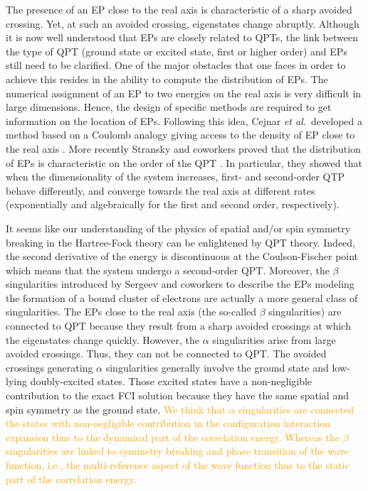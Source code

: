 \documentclass[11pt,a4paper]{article}
\newcommand{\antoine}[1]{\textcolor{orange}{#1}}
\begin{document}
The presence of an EP close to the real axis is characteristic of a sharp avoided crossing. Yet, at such an avoided crossing, eigenstates change abruptly. Although it is now well understood that EPs are closely related to QPTs, the link between the type of QPT (ground state or excited state, first or higher order) and EPs still need to be clarified. One of the major obstacles that one faces in order to achieve this resides in the ability to compute the distribution of EPs. The numerical assignment of an EP to two energies on the real axis is very difficult in large dimensions. Hence, the design of specific methods are required to get information on the location of EPs. Following this idea, Cejnar \textit{et al.}~developed a method based on a Coulomb analogy giving access to the density of EP close to the real axis \cite{Cejnar_2005, Cejnar_2007}. More recently Stransky and coworkers proved that the distribution of EPs is characteristic on the order of the QPT \cite{Stransky_2018}. In particular, they showed that when the dimensionality of the system increases, first- and second-order QTP behave differently, and converge towards the real axis at different rates (exponentially and algebraically for the first and second order, respectively).

It seems like our understanding of the physics of spatial and/or spin symmetry breaking in the Hartree-Fock theory can be enlightened by QPT theory. Indeed, the second derivative of the energy is discontinuous at the Coulson-Fischer point which means that the system undergo a second-order QPT. Moreover, the $\beta$ singularities introduced by Sergeev and coworkers to describe the EPs modeling the formation of a bound cluster of electrons are actually a more general class of singularities. The EPs close to the real axis (the so-called $\beta$ singularities) are connected to QPT because they result from a sharp avoided crossings at which the eigenstates change quickly. However, the $\alpha$ singularities arise from large avoided crossings. Thus, they can not be connected to QPT. The avoided crossings generating $\alpha$ singularities generally involve the ground state and low-lying doubly-excited states. Those excited states have a non-negligible contribution to the exact FCI solution because they have the same spatial and spin symmetry as the ground state. \antoine{We think that $\alpha$ singularities are connected the states with non-negligible contribution in the configuration interaction expansion thus to the dynamical part of the correlation energy. Whereas the $\beta$ singularities are linked to symmetry breaking and phase transition of the wave function, i.e., the multi-reference aspect of the wave function thus to the static part of the correlation energy.}
\end{document}
